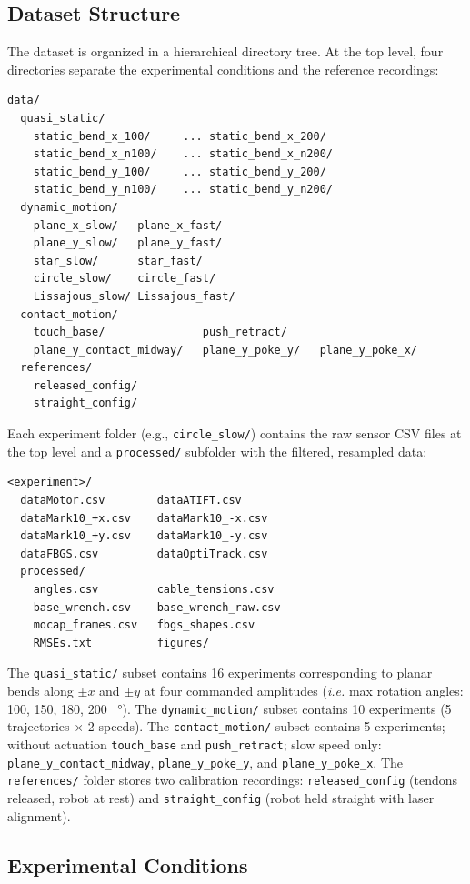 \documentclass[14pt, a4paper]{article}
\newcommand{\ie}{\textit{i.e.}}
\begin{document}
\subsection{Dataset Structure}
\label{sec:dataset_structure}
The dataset is organized in a hierarchical directory tree.
At the top level, four directories separate the experimental conditions and the reference recordings:
%
\begin{verbatim}
data/
  quasi_static/
    static_bend_x_100/     ... static_bend_x_200/
    static_bend_x_n100/    ... static_bend_x_n200/
    static_bend_y_100/     ... static_bend_y_200/
    static_bend_y_n100/    ... static_bend_y_n200/
  dynamic_motion/
    plane_x_slow/   plane_x_fast/
    plane_y_slow/   plane_y_fast/
    star_slow/      star_fast/
    circle_slow/    circle_fast/
    Lissajous_slow/ Lissajous_fast/
  contact_motion/
    touch_base/               push_retract/     
    plane_y_contact_midway/   plane_y_poke_y/   plane_y_poke_x/   
  references/
    released_config/
    straight_config/
\end{verbatim}
%
Each experiment folder (e.g., \texttt{circle\_slow/}) contains the raw sensor CSV files at the top level and a \texttt{processed/} subfolder with the filtered, resampled data:
%
\begin{verbatim}
<experiment>/
  dataMotor.csv        dataATIFT.csv
  dataMark10_+x.csv    dataMark10_-x.csv
  dataMark10_+y.csv    dataMark10_-y.csv
  dataFBGS.csv         dataOptiTrack.csv
  processed/
    angles.csv         cable_tensions.csv
    base_wrench.csv    base_wrench_raw.csv
    mocap_frames.csv   fbgs_shapes.csv
    RMSEs.txt          figures/
\end{verbatim}
%
The \texttt{quasi\_static/} subset contains 16 experiments corresponding to planar bends along $\pm x$ and $\pm y$ at four commanded amplitudes (\ie{} max rotation angles: 100, 150, 180, 200 \SI{}{\degree}).
The \texttt{dynamic\_motion/} subset contains 10 experiments (5 trajectories $\times$ 2 speeds).
The \texttt{contact\_motion/} subset contains 5 experiments; without actuation \texttt{touch\_base} and \texttt{push\_retract}; slow speed only: \texttt{plane\_y\_contact\_midway}, \texttt{plane\_y\_poke\_y}, and \texttt{plane\_y\_poke\_x}.
The \texttt{references/} folder stores two calibration recordings: \texttt{released\_config} (tendons released, robot at rest) and \texttt{straight\_config} (robot held straight with laser alignment).


\subsection{Experimental Conditions}
\label{sec:experimental_conditions}
\end{document}
